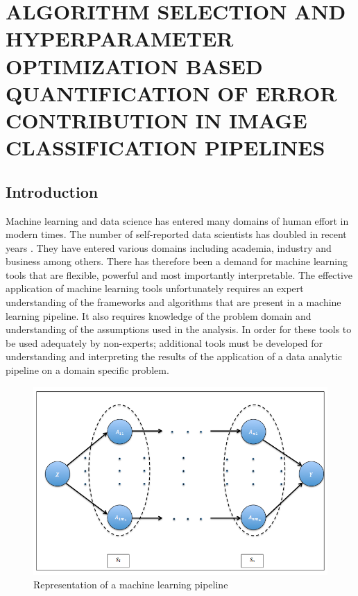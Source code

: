 \chapter{ALGORITHM SELECTION AND HYPERPARAMETER OPTIMIZATION BASED QUANTIFICATION OF ERROR CONTRIBUTION IN IMAGE CLASSIFICATION PIPELINES}
\label{chap:EP}

\let\thefootnote\relax\footnotetext{}


\section{Introduction} 
\label{sec1}
Machine learning and data science has entered many domains of human effort in modern times. The number of self-reported data scientists has doubled in recent years \cite{harrison1995validity}. They have entered various domains including academia, industry and business among others. There has therefore been a demand for machine learning tools that are flexible, powerful and most importantly interpretable. The effective application of machine learning tools unfortunately requires an expert understanding of the frameworks and algorithms that are present in a machine learning pipeline. It also requires knowledge of the problem domain and understanding of the assumptions used in the analysis. In order for these tools to be used adequately by non-experts; additional tools must be developed for understanding and interpreting the results of the application of a data analytic pipeline on a domain specific problem.  

\begin{figure}[ht!]
    \centering
    \includegraphics[scale=0.5]{img/EP/generalized_pipeline}
    \caption{Representation of a machine learning pipeline}
    \label{fig:pipeline}
\end{figure}

